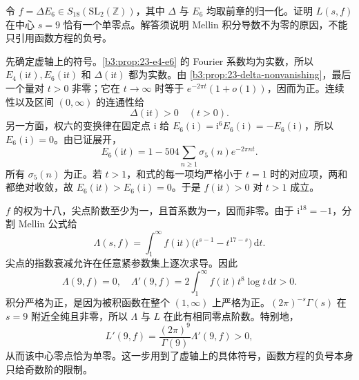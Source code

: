 \begin{exercise}\label{b3:ex:E-2}
令 \(f=\Delta E_6\in S_{18}(\mathrm{SL}_2(\mathbb Z))\)，其中 \(\Delta\) 与 \(E_6\) 均取前章的归一化。证明 \(L(s,f)\) 在中心 \(s=9\) 恰有一个单零点。解答须说明 Mellin 积分导数不为零的原因，不能只引用函数方程的负号。
\end{exercise}
\begin{solution}
先确定虚轴上的符号。\cref{b3:prop:23-e4-e6} 的 Fourier 系数均为实数，所以 \(E_4(\mathrm{i}t),E_6(\mathrm{i}t)\) 和 \(\Delta(\mathrm{i}t)\) 都为实数。由 \cref{b3:prop:23-delta-nonvanishing}，最后一个量对 \(t>0\) 非零；它在 \(t\to\infty\) 时等于 \(e^{-2\pi t}(1+o(1))\)，因而为正。连续性以及区间 \((0,\infty)\) 的连通性给
\[
 \Delta(\mathrm{i}t)>0\quad(t>0).
\]
另一方面，权六的变换律在固定点 \(\mathrm{i}\) 给
\(E_6(\mathrm{i})=\mathrm{i}^6E_6(\mathrm{i})=-E_6(\mathrm{i})\)，所以 \(E_6(\mathrm{i})=0\)。由已证展开，
\[
 E_6(\mathrm{i}t)=1-504\sum_{n\ge1}\sigma_5(n)e^{-2\pi nt}.
\]
所有 \(\sigma_5(n)\) 为正。若 \(t>1\)，和式的每一项均严格小于 \(t=1\) 时的对应项，两和都绝对收敛，故 \(E_6(\mathrm{i}t)>E_6(\mathrm{i})=0\)。于是 \(f(\mathrm{i}t)>0\) 对 \(t>1\) 成立。

\(f\) 的权为十八，尖点阶数至少为一，且首系数为一，因而非零。由于 \(\mathrm{i}^{18}=-1\)，分割 Mellin 公式给
\[
 \Lambda(s,f)=\int_1^\infty f(\mathrm{i}t)
       \bigl(t^{s-1}-t^{17-s}\bigr)\,\mathrm{d}t.
\]
尖点的指数衰减允许在任意紧参数集上逐次求导。因此
\[
 \Lambda(9,f)=0,
 \quad \Lambda'(9,f)
 =2\int_1^\infty f(\mathrm{i}t)t^8\log t\,\mathrm{d}t>0.
\]
积分严格为正，是因为被积函数在整个 \((1,\infty)\) 上严格为正。\((2\pi)^{-s}\Gamma(s)\) 在 \(s=9\) 附近全纯且非零，所以 \(\Lambda\) 与 \(L\) 在此有相同零点阶数。特别地，
\[
 L'(9,f)=\frac{(2\pi)^9}{\Gamma(9)}\Lambda'(9,f)>0,
\]
从而该中心零点恰为单零。这一步用到了虚轴上的具体符号，函数方程的负号本身只给奇数阶的限制。
\end{solution}

